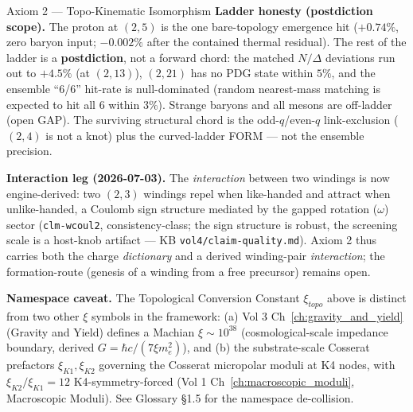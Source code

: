 \begin{resultbox}{Axiom 2 — Topo-Kinematic Isomorphism}
\medskip\noindent
\textbf{Ladder honesty (postdiction scope).} The proton at $(2,5)$ is the one bare-topology emergence hit ($+0.74\%$, zero baryon input; $-0.002\%$ after the contained thermal residual). The rest of the ladder is a \textbf{postdiction}, not a forward chord: the matched $N/\Delta$ deviations run out to $+4.5\%$ (at $(2,13)$), $(2,21)$ has no PDG state within $5\%$, and the ensemble ``6/6'' hit-rate is null-dominated (random nearest-mass matching is expected to hit all 6 within $3\%$). Strange baryons and all mesons are off-ladder (open GAP). The surviving structural chord is the odd-$q$/even-$q$ link-exclusion ($(2,4)$ is not a knot) plus the curved-ladder FORM --- not the ensemble precision.

\medskip\noindent
\textbf{Interaction leg (2026-07-03).} The \emph{interaction} between two windings is now engine-derived: two $(2,3)$ windings repel when like-handed and attract when unlike-handed, a Coulomb sign structure mediated by the gapped rotation ($\omega$) sector (\texttt{clm-wcoul2}, consistency-class; the sign structure is robust, the screening scale is a host-knob artifact --- KB \texttt{vol4/claim-quality.md}). Axiom 2 thus carries both the charge \emph{dictionary} and a derived winding-pair \emph{interaction}; the formation-route (genesis of a winding from a free precursor) remains open.

\medskip\noindent
\textbf{Namespace caveat.} The Topological Conversion Constant $\xi_{topo}$ above is distinct from two other $\xi$ symbols in the framework: (a) Vol 3 Ch~\ref{ch:gravity_and_yield} (Gravity and Yield) defines a Machian $\xi \sim 10^{38}$ (cosmological-scale impedance boundary, derived $G = \hbar c / (7 \xi m_e^2)$), and (b) the substrate-scale Cosserat prefactors $\xi_{K1}, \xi_{K2}$ governing the Cosserat micropolar moduli at K4 nodes, with $\xi_{K2}/\xi_{K1} = 12$ K4-symmetry-forced (Vol 1 Ch~\ref{ch:macroscopic_moduli}, Macroscopic Moduli). See Glossary §1.5 for the namespace de-collision.
\end{resultbox}

